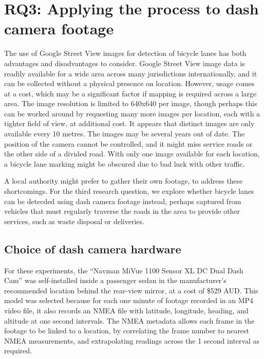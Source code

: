 \documentclass[11pt,twoside]{report}
\begin{document}
\section{RQ3: Applying the process to dash camera footage}
\label{s:rq3}

The use of Google Street View images for detection of bicycle lanes has both advantages and disadvantages to consider.  Google Street View image data is readily available for a wide area across many jurisdictions internationally, and it can be collected without a physical presence on location.  However, usage comes at a cost, which may be a significant factor if mapping is required across a large area.  The image resolution is limited to 640x640 per image, though perhaps this can be worked around by requesting many more images per location, each with a tighter field of view, at additional cost.  It appears that distinct images are only available every 10 metres.  The images may be several years out of date.  The position of the camera cannot be controlled, and it might miss service roads or the other side of a divided road.  With only one image available for each location, a bicycle lane marking might be obscured due to bad luck with other traffic.

A local authority might prefer to gather their own footage, to address these shortcomings.  For the third research question, we explore whether bicycle lanes can be detecded using dash camera footage instead, perhaps captured from vehicles that must regularly traverse the roads in the area to provide other services, such as waste disposal or deliveries.


\subsection{Choice of dash camera hardware}
\label{s:rq3a}

For these experiments, the ``Navman MiVue 1100 Sensor XL DC Dual Dash Cam'' was self-installed inside a passenger sedan in the manufacturer's recommended location behind the rear-view mirror, at a cost of \$529 AUD.  This model was selected because for each one minute of footage recorded in an MP4 video file, it also records an NMEA file with latitude, longitude, heading, and altitude at one second intervals.  The NMEA metadata allows each frame in the footage to be linked to a location, by correlating the frame number to nearest NMEA measurements, and extrapolating readings across the 1 second interval as required.
\end{document}
